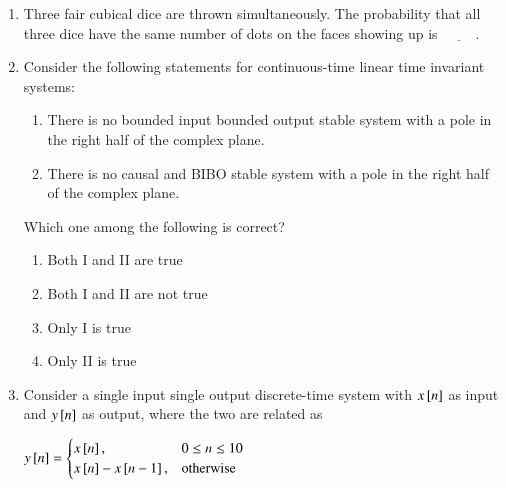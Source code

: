 \documentclass[journal,12pt,onecolumn]{IEEEtran}
\theoremstyle{remark}
\begin{document}
\begin{enumerate}
Which one among the following is correct?  
\begin{multicols}{2}
\begin{enumerate}
\item Both I and II are true
\item Both I and III are true
\item Both II and IV are true
\item Both III and IV are true
\end{enumerate}
\end{multicols}
\hfill {}

\item Three fair cubical dice are thrown simultaneously. The probability that all three dice have the same number of dots on the faces showing up is  $\underline{\hspace{1cm}}$.

\hfill {}

\item Consider the following statements for continuous-time linear time invariant  systems:  
\begin{enumerate}[label=\Roman*.]
    \item There is no bounded input bounded output  stable system with a pole in the right half of the complex plane.
    \item There is no causal and BIBO stable system with a pole in the right half of the complex plane.  
\end{enumerate}

Which one among the following is correct?  
\begin{multicols}{2}
\begin{enumerate}
\item Both I and II are true
\item Both I and II are not true
\item Only I is true
\item Only II is true
\end{enumerate}
\end{multicols}
\hfill {}

\item Consider a single input single output discrete-time system with $x{}\left[n\right]$ as input and $y{}\left[n\right]$ as output, where the two are related as  

$
y{}\left[n\right] = \begin{cases}
x{}\left[n\right], & 0 \leq n \leq 10 \\
x{}\left[n\right] - x{}\left[n-1\right], & \text{otherwise}
\end{cases}
$
  

\end{enumerate}
\end{document}

